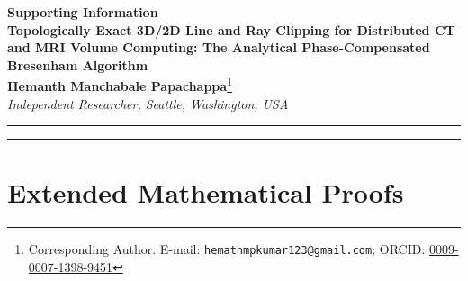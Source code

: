 \documentclass[11pt]{article}
\begin{document}
\begin{center}
    {\LARGE \textbf{Supporting Information}}\\[12pt]
    {\Large \textbf{Topologically Exact 3D/2D Line and Ray Clipping for Distributed CT and MRI Volume Computing: The Analytical Phase-Compensated Bresenham Algorithm}}\\[14pt]
    \textbf{Hemanth Manchabale Papachappa}\footnote{Corresponding Author. E-mail: \texttt{hemathmpkumar123@gmail.com}; ORCID: \href{https://orcid.org/0009-0007-1398-9451}{0009-0007-1398-9451}}\\[6pt]
    \textit{Independent Researcher, Seattle, Washington, USA}
\end{center}

\vspace{0.8cm}
\hrule
\vspace{0.4cm}

\tableofcontents

\vspace{0.4cm}
\hrule
\vspace{0.8cm}

\section{Extended Mathematical Proofs}
\label{sec:si_proofs}
\end{document}
